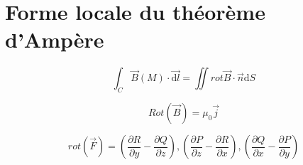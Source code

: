 \documentclass[french]{yLectureNote}
\renewcommand{\vec}{\overrightarrow}
\newcommand{\dd}{\mathrm{d}}
\newcommand{\B}{\vec{B}(M)}
\newcommand{\ep}{\vec{e_{\varphi}}}
\begin{document}
\section{Forme locale du théorème d'Ampère}
\begin{theorem}
 \[\int_C \B \cdot \vec{\dd l} = \iint rot \vec{B}\cdot \vec{n}\dd S\]
\end{theorem}
\begin{theorem}
\[Rot(\vec{B})=\mu_0 \vec{j}\]
\end{theorem}
\begin{definition}[Rotationnel]
\[rot(\vec{F}) = (\frac{\partial R}{\partial y}-\frac{\partial Q}{\partial z}),  (\frac{\partial P}{\partial z}-\frac{\partial R}{\partial x}),  (\frac{\partial Q}{\partial x}-\frac{\partial P}{\partial y})\]
\end{definition}
 
\end{document}
